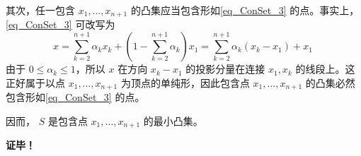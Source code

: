 其次，任一包含 $x_1,\ldots,x_{n+1}$ 的凸集应当包含形如\autoref{eq_ConSet_3} 的点。事实上，\autoref{eq_ConSet_3} 可改写为
\begin{equation}
x=\sum_{k=2}^{n+1}\alpha_kx_k+(1-\sum_{k=2}^{n+1}\alpha_k)x_1=\sum_{k=2}^{n+1}\alpha_k(x_k-x_1)+x_1~
\end{equation}
由于 $0\leq\alpha_k\leq1$，所以 $x$ 在方向 $x_k-x_1$ 的投影分量在连接 $x_1,x_k$ 的线段上。这正好属于以点 $x_1,\ldots,x_{n+1}$ 为顶点的单纯形，因此包含点 $x_1,\ldots,x_{n+1}$ 的凸集必然包含形如\autoref{eq_ConSet_3} 的点。

因而， $S$ 是包含点 $x_1,\ldots,x_{n+1}$ 的最小凸集。

\textbf{证毕！}























